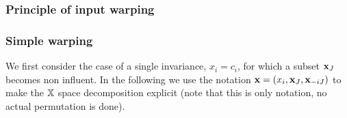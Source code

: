 %  
% 
% 
%  
% 
% 
% 

\subsubsection{Principle of input warping}

\cite{snoek2014input,marmin2018warped}


\subsubsection{Simple warping}
We first consider the case of a single invariance, $x_i = c_i$, for which a subset $\mathbf{x}_J$ becomes non influent. 
In the following we use the notation $\mathbf{x} = (x_i, \mathbf{x}_J, \mathbf{x}_{-iJ})$ to make the $\mathbb{X}$ space decomposition explicit (note that this is only notation, 
no actual permutation is done).

